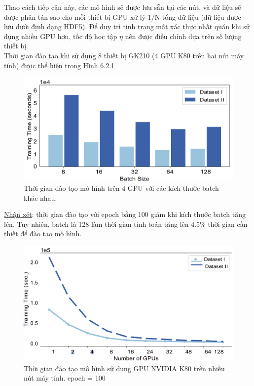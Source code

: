 \documentclass[11pt,a4paper]{article}
\numberwithin{equation}{subsection}
\numberwithin{figure}{subsection}
\numberwithin{table}{subsection}
\begin{document}
Thao cách tiếp cận này, các mô hình sẽ được lưu sẵn tại các nút, và dữ liệu sẽ được phân tán sao cho mỗi thiết bị GPU xử lý 1/N tổng dữ liệu (dữ liệu được lưu dưới định dạng HDF5). Để duy trì tình trạng mất xác thực nhất quán khi sử dụng nhiều GPU hơn, tốc độ học tập $\eta$ nên được điều chỉnh dựa trên số lượng thiết bị.\\

Thời gian đào tạo khi sử dụng 8 thiết bị GK210 (4 GPU K80 trên hai nút máy tính) được thể hiện trong Hình 6.2.1

\begin{figure}[!h]
	\begin{center}
		\includegraphics[scale=0.5]{MIT_1.PNG}
	\end{center}
	\caption{Thời gian đào tạo mô hình trên 4 GPU với các kích thước batch khác nhau. }
\end{figure}

\underline{Nhận xét}: thời gian đào tạo với epoch bằng 100 giảm khi kích thước batch tăng lên. Tuy nhiên, batch là 128 làm thời gian tính toán tăng lên 4.5\%  thời gian cần thiết để đào tạo mô hình. 

\begin{figure}[!h]
	\begin{center}
		\includegraphics[scale=0.45]{MIT_2.PNG}
	\end{center}
	\caption{Thời gian đào tạo mô hình sử dụng GPU NVIDIA K80 trên nhiều nút máy tính. epoch = 100 }
\end{figure}
\end{document}
